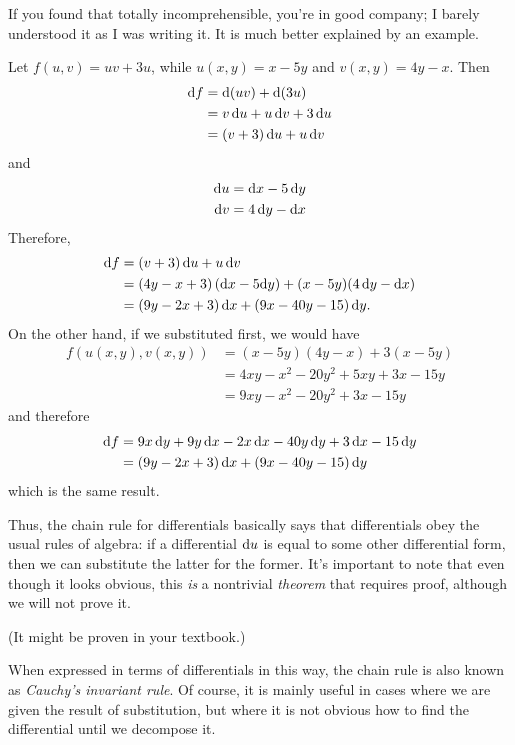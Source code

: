\documentclass[12pt]{amsart}
\begin{document}
If you found that totally incomprehensible, you're in good company; I barely understood it as I was writing it.
It is much better explained by an example.

\begin{eg}
  Let $f(u,v) = u v + 3u$, while $u(x,y) = x-5y$ and $v(x,y) = 4y-x$.
  Then
  \begin{align*}
    {\ensuremath{\mathrm{d} f}} &= \mathrm{d}(u v) + \mathrm{d}(3u)\\
    &= v \,{\mathrm{d} u} + u\,{\mathrm{d} v} + 3 \,{\mathrm{d} u}\\
    &= (v+3)\,{\mathrm{d} u} + u\,{\mathrm{d} v}
  \end{align*}
  and
  \begin{align*}
    {\ensuremath{\mathrm{d} u}} &= {\mathrm{d} x} - 5\, {\mathrm{d} y}\\
    {\mathrm{d} v} &= 4\,{\mathrm{d} y} - {\mathrm{d} x}
  \end{align*}
  Therefore,
  \begin{align*}
    {\ensuremath{\mathrm{d} f}} &= (v+3)\,{\mathrm{d} u} + u\,{\mathrm{d} v}\\
    &= (4y-x+3)\,({\mathrm{d} x} - 5 {\mathrm{d} y}) + (x-5y) (4\,{\mathrm{d} y} - {\mathrm{d} x}) \\
    &= (9y-2x+3)\,{\mathrm{d} x} + (9x - 40y - 15)\,{\mathrm{d} y}.
  \end{align*}
  On the other hand, if we substituted first, we would have
  \begin{align*}
    f(u(x,y),v(x,y)) &= (x-5y)(4y-x) + 3(x-5y)\\
    &= 4xy - x^2 - 20y^2 + 5xy + 3x - 15 y\\
    &= 9xy - x^2 - 20y^2 + 3x - 15 y
  \end{align*}
  and therefore
  \begin{align*}
    {\ensuremath{\mathrm{d} f}} &= 9x\, {\mathrm{d} y} + 9y\, {\mathrm{d} x} - 2 x\,{\mathrm{d} x} - 40 y\,{\mathrm{d} y} + 3\,{\mathrm{d} x} - 15\,{\mathrm{d} y}\\
    &= (9y - 2x +3)\,{\mathrm{d} x} + (9x - 40y - 15)\,{\mathrm{d} y}
  \end{align*}
  which is the same result.
\end{eg}

Thus, the chain rule for differentials basically says that differentials obey the usual rules of algebra: if a differential ${\mathrm{d} u}$ is equal to some other differential form, then we can substitute the latter for the former.
It's important to note that even though it looks obvious, this \emph{is} a nontrivial \emph{theorem} that requires proof, although we will not prove it.
\begin{notextbook}(It might be proven in your textbook.)\end{notextbook}

When expressed in terms of differentials in this way, the chain rule is also known as \emph{Cauchy's invariant rule}.
Of course, it is mainly useful in cases where we are given the result of substitution, but where it is not obvious how to find the differential until we decompose it.
\end{document}
